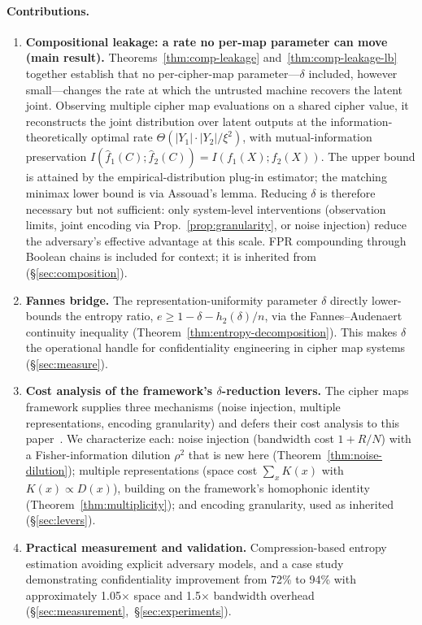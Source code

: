 \documentclass[11pt]{article}
\theoremstyle{definition}
\theoremstyle{plain}
\theoremstyle{remark}
\newcommand{\fhat}{\hat{f}}
\begin{document}
\paragraph{Contributions.}
\begin{enumerate}
\item \textbf{Compositional leakage: a rate no per-map parameter can
  move (main result).}  Theorems~\ref{thm:comp-leakage}
  and~\ref{thm:comp-leakage-lb} together establish that no
  per-cipher-map parameter---$\delta$ included, however small---changes
  the rate at which the untrusted machine recovers the latent joint.
  Observing multiple cipher map evaluations on a shared cipher value,
  it reconstructs the joint distribution over latent outputs at the
  information-theoretically optimal rate
  $\Theta(|Y_1|\cdot|Y_2|/\xi^2)$, with mutual-information preservation
  $I(\fhat_1(C); \fhat_2(C)) = I(f_1(X); f_2(X))$.  The upper bound is
  attained by the empirical-distribution plug-in estimator; the
  matching minimax lower bound is via Assouad's lemma.  Reducing
  $\delta$ is therefore necessary but not
  sufficient: only system-level interventions (observation limits,
  joint encoding via Prop.~\ref{prop:granularity}, or noise injection)
  reduce the adversary's effective advantage at this scale.  FPR
  compounding through Boolean chains is included for context; it is
  inherited from~\cite{towell2026cipher} (\S\ref{sec:composition}).

\item \textbf{Fannes bridge.}  The representation-uniformity parameter
  $\delta$ directly lower-bounds the entropy ratio,
  $e \geq 1 - \delta - h_2(\delta)/n$, via the Fannes--Audenaert
  continuity inequality (Theorem~\ref{thm:entropy-decomposition}).
  This makes $\delta$ the operational handle for confidentiality
  engineering in cipher map systems (\S\ref{sec:measure}).

\item \textbf{Cost analysis of the framework's $\delta$-reduction
  levers.}  The cipher maps framework supplies three mechanisms
  (noise injection, multiple representations, encoding granularity) and
  defers their cost analysis to this paper~\cite[Rem.~5.1]{towell2026cipher}.
  We characterize each: noise injection (bandwidth cost $1 + R/N$) with
  a Fisher-information dilution $\rho^2$ that is new here
  (Theorem~\ref{thm:noise-dilution}); multiple representations (space
  cost $\sum_x K(x)$ with $K(x)\propto D(x)$), building on the
  framework's homophonic identity~\cite[Prop.~4.1]{towell2026cipher}
  (Theorem~\ref{thm:multiplicity}); and encoding granularity, used as
  inherited (\S\ref{sec:levers}).

\item \textbf{Practical measurement and validation.}  Compression-based
  entropy estimation avoiding explicit adversary models, and a case
  study demonstrating confidentiality improvement from 72\% to 94\%
  with approximately 1.05$\times$ space and 1.5$\times$ bandwidth
  overhead (\S\ref{sec:measurement},~\S\ref{sec:experiments}).
\end{enumerate}
\end{document}
